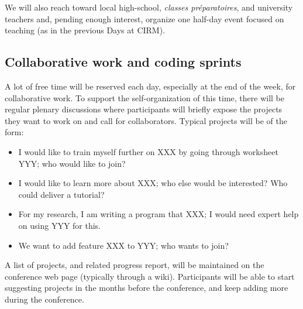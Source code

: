 \documentclass[12pt]{amsart}
\begin{document}
We will also reach toward local high-school, \textit{classes préparatoires},
and university teachers and, pending enough interest, organize one
half-day event focused on teaching (as in the previous \Sage Days at
CIRM).

\subsection{Collaborative work and coding sprints}

A lot of free time will be reserved each day, especially at the end of
the week, for collaborative work. To support the self-organization of
this time, there will be regular plenary discussions where
participants will briefly expose the projects they want to work on and
call for collaborators. Typical projects will be of the form:
\begin{itemize}
\item I would like to train myself further on XXX by going through
  worksheet YYY; who would like to join?
\item I would like to learn more about XXX; who else would be
  interested? Who could deliver a tutorial?
\item For my research, I am writing a program that XXX; I would need
  expert help on using YYY for this.
\item We want to add feature XXX to YYY; who wants to join?
\end{itemize}

A list of projects, and related progress report, will be maintained on
the conference web page (typically through a wiki). Participants will
be able to start suggesting projects in the months before the conference,
and keep adding more during the conference.
\end{document}
